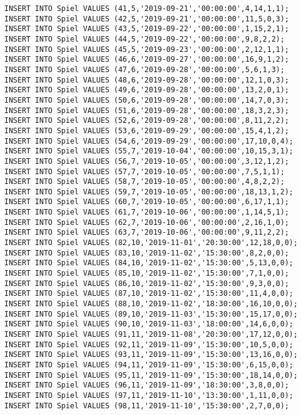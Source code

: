 \documentclass{bschlangaul-aufgabe}
\begin{document}
\begin{verbatim}
INSERT INTO Spiel VALUES (41,5,'2019-09-21','00:00:00',4,14,1,1);
INSERT INTO Spiel VALUES (42,5,'2019-09-21','00:00:00',11,5,0,3);
INSERT INTO Spiel VALUES (43,5,'2019-09-22','00:00:00',1,15,2,1);
INSERT INTO Spiel VALUES (44,5,'2019-09-22','00:00:00',9,8,2,2);
INSERT INTO Spiel VALUES (45,5,'2019-09-23','00:00:00',2,12,1,1);
INSERT INTO Spiel VALUES (46,6,'2019-09-27','00:00:00',16,9,1,2);
INSERT INTO Spiel VALUES (47,6,'2019-09-28','00:00:00',5,6,1,3);
INSERT INTO Spiel VALUES (48,6,'2019-09-28','00:00:00',12,1,0,3);
INSERT INTO Spiel VALUES (49,6,'2019-09-28','00:00:00',13,2,0,1);
INSERT INTO Spiel VALUES (50,6,'2019-09-28','00:00:00',14,7,0,3);
INSERT INTO Spiel VALUES (51,6,'2019-09-28','00:00:00',18,3,2,3);
INSERT INTO Spiel VALUES (52,6,'2019-09-28','00:00:00',8,11,2,2);
INSERT INTO Spiel VALUES (53,6,'2019-09-29','00:00:00',15,4,1,2);
INSERT INTO Spiel VALUES (54,6,'2019-09-29','00:00:00',17,10,0,4);
INSERT INTO Spiel VALUES (55,7,'2019-10-04','00:00:00',10,15,3,1);
INSERT INTO Spiel VALUES (56,7,'2019-10-05','00:00:00',3,12,1,2);
INSERT INTO Spiel VALUES (57,7,'2019-10-05','00:00:00',7,5,1,1);
INSERT INTO Spiel VALUES (58,7,'2019-10-05','00:00:00',4,8,2,2);
INSERT INTO Spiel VALUES (59,7,'2019-10-05','00:00:00',18,13,1,2);
INSERT INTO Spiel VALUES (60,7,'2019-10-05','00:00:00',6,17,1,1);
INSERT INTO Spiel VALUES (61,7,'2019-10-06','00:00:00',1,14,5,1);
INSERT INTO Spiel VALUES (62,7,'2019-10-06','00:00:00',2,16,1,0);
INSERT INTO Spiel VALUES (63,7,'2019-10-06','00:00:00',9,11,2,2);
INSERT INTO Spiel VALUES (82,10,'2019-11-01','20:30:00',12,18,0,0);
INSERT INTO Spiel VALUES (83,10,'2019-11-02','15:30:00',8,2,0,0);
INSERT INTO Spiel VALUES (84,10,'2019-11-02','15:30:00',5,13,0,0);
INSERT INTO Spiel VALUES (85,10,'2019-11-02','15:30:00',7,1,0,0);
INSERT INTO Spiel VALUES (86,10,'2019-11-02','15:30:00',9,3,0,0);
INSERT INTO Spiel VALUES (87,10,'2019-11-02','15:30:00',11,4,0,0);
INSERT INTO Spiel VALUES (88,10,'2019-11-02','18:30:00',16,10,0,0);
INSERT INTO Spiel VALUES (89,10,'2019-11-03','15:30:00',15,17,0,0);
INSERT INTO Spiel VALUES (90,10,'2019-11-03','18:00:00',14,6,0,0);
INSERT INTO Spiel VALUES (91,11,'2019-11-08','20:30:00',17,12,0,0);
INSERT INTO Spiel VALUES (92,11,'2019-11-09','15:30:00',10,5,0,0);
INSERT INTO Spiel VALUES (93,11,'2019-11-09','15:30:00',13,16,0,0);
INSERT INTO Spiel VALUES (94,11,'2019-11-09','15:30:00',6,15,0,0);
INSERT INTO Spiel VALUES (95,11,'2019-11-09','15:30:00',18,14,0,0);
INSERT INTO Spiel VALUES (96,11,'2019-11-09','18:30:00',3,8,0,0);
INSERT INTO Spiel VALUES (97,11,'2019-11-10','13:30:00',1,11,0,0);
INSERT INTO Spiel VALUES (98,11,'2019-11-10','15:30:00',2,7,0,0);

\end{verbatim}
\end{document}
